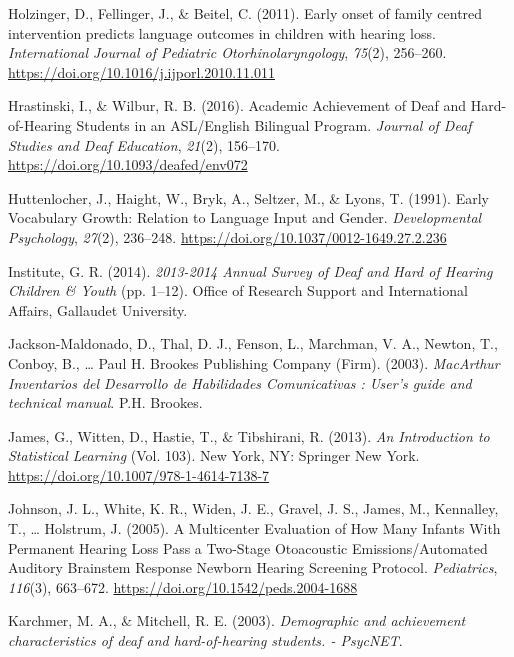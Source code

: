 \documentclass[
  english,
  man]{apa6}
\begin{document}
\leavevmode\hypertarget{ref-holzinger2011}{}%
Holzinger, D., Fellinger, J., \& Beitel, C. (2011). Early onset of family centred intervention predicts language outcomes in children with hearing loss. \emph{International Journal of Pediatric Otorhinolaryngology}, \emph{75}(2), 256--260. \url{https://doi.org/10.1016/j.ijporl.2010.11.011}

\leavevmode\hypertarget{ref-hrastinski2016}{}%
Hrastinski, I., \& Wilbur, R. B. (2016). Academic Achievement of Deaf and Hard-of-Hearing Students in an ASL/English Bilingual Program. \emph{Journal of Deaf Studies and Deaf Education}, \emph{21}(2), 156--170. \url{https://doi.org/10.1093/deafed/env072}

\leavevmode\hypertarget{ref-huttenlocher1991}{}%
Huttenlocher, J., Haight, W., Bryk, A., Seltzer, M., \& Lyons, T. (1991). Early Vocabulary Growth: Relation to Language Input and Gender. \emph{Developmental Psychology}, \emph{27}(2), 236--248. \url{https://doi.org/10.1037/0012-1649.27.2.236}

\leavevmode\hypertarget{ref-gallaudetresearchinstitute2014}{}%
Institute, G. R. (2014). \emph{2013-2014 Annual Survey of Deaf and Hard of Hearing Children \& Youth} (pp. 1--12). Office of Research Support and International Affairs, Gallaudet University.

\leavevmode\hypertarget{ref-jackson-maldonado2003}{}%
Jackson-Maldonado, D., Thal, D. J., Fenson, L., Marchman, V. A., Newton, T., Conboy, B., \ldots{} Paul H. Brookes Publishing Company (Firm). (2003). \emph{MacArthur Inventarios del Desarrollo de Habilidades Comunicativas : User's guide and technical manual}. P.H. Brookes.

\leavevmode\hypertarget{ref-james2013}{}%
James, G., Witten, D., Hastie, T., \& Tibshirani, R. (2013). \emph{An Introduction to Statistical Learning} (Vol. 103). New York, NY: Springer New York. \url{https://doi.org/10.1007/978-1-4614-7138-7}

\leavevmode\hypertarget{ref-johnson2005}{}%
Johnson, J. L., White, K. R., Widen, J. E., Gravel, J. S., James, M., Kennalley, T., \ldots{} Holstrum, J. (2005). A Multicenter Evaluation of How Many Infants With Permanent Hearing Loss Pass a Two-Stage Otoacoustic Emissions/Automated Auditory Brainstem Response Newborn Hearing Screening Protocol. \emph{Pediatrics}, \emph{116}(3), 663--672. \url{https://doi.org/10.1542/peds.2004-1688}

\leavevmode\hypertarget{ref-karchmer2003}{}%
Karchmer, M. A., \& Mitchell, R. E. (2003). \emph{Demographic and achievement characteristics of deaf and hard-of-hearing students. - PsycNET}.
\end{document}
